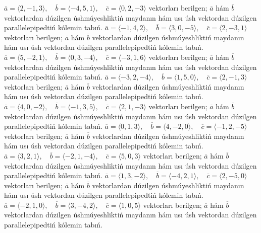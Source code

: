 \(\overline{a} = \langle 2, -1, 3 \rangle, \quad \overline{b} = \langle -4, 5, 1 \rangle, \quad \overline{c} = \langle 0, 2, -3 \rangle\) vektorları berilgen; \(\overline{a}\) hám \(\overline{b}\) vektorlardan dúzilgen úshmúyeshliktiń maydanın hám usı úsh vektordan dúzilgen parallelepipedtiń kólemin tabıń.
\(\overline{a} = \langle -1, 4, 2 \rangle, \quad \overline{b} = \langle 3, 0, -5 \rangle, \quad \overline{c} = \langle 2, -3, 1 \rangle\) vektorları berilgen; \(\overline{a}\) hám \(\overline{b}\) vektorlardan dúzilgen úshmúyeshliktiń maydanın hám usı úsh vektordan dúzilgen parallelepipedtiń kólemin tabıń.
\(\overline{a} = \langle 5, -2, 1 \rangle, \quad \overline{b} = \langle 0, 3, -4 \rangle, \quad \overline{c} = \langle -3, 1, 6 \rangle\) vektorları berilgen; \(\overline{a}\) hám \(\overline{b}\) vektorlardan dúzilgen úshmúyeshliktiń maydanın hám usı úsh vektordan dúzilgen parallelepipedtiń kólemin tabıń.
\(\overline{a} = \langle -3, 2, -4 \rangle, \quad \overline{b} = \langle 1, 5, 0 \rangle, \quad \overline{c} = \langle 2, -1, 3 \rangle\) vektorları berilgen; \(\overline{a}\) hám \(\overline{b}\) vektorlardan dúzilgen úshmúyeshliktiń maydanın hám usı úsh vektordan dúzilgen parallelepipedtiń kólemin tabıń.
\(\overline{a} = \langle 4, 0, -2 \rangle, \quad \overline{b} = \langle -1, 3, 5 \rangle, \quad \overline{c} = \langle 2, 1, -3 \rangle\) vektorları berilgen; \(\overline{a}\) hám \(\overline{b}\) vektorlardan dúzilgen úshmúyeshliktiń maydanın hám usı úsh vektordan dúzilgen parallelepipedtiń kólemin tabıń.
\(\overline{a} = \langle 0, 1, 3 \rangle, \quad \overline{b} = \langle 4, -2, 0 \rangle, \quad \overline{c} = \langle -1, 2, -5 \rangle\) vektorları berilgen; \(\overline{a}\) hám \(\overline{b}\) vektorlardan dúzilgen úshmúyeshliktiń maydanın hám usı úsh vektordan dúzilgen parallelepipedtiń kólemin tabıń.
\(\overline{a} = \langle 3, 2, 1 \rangle, \quad \overline{b} = \langle -2, 1, -4 \rangle, \quad \overline{c} = \langle 5, 0, 3 \rangle\) vektorları berilgen; \(\overline{a}\) hám \(\overline{b}\) vektorlardan dúzilgen úshmúyeshliktiń maydanın hám usı úsh vektordan dúzilgen parallelepipedtiń kólemin tabıń.
\(\overline{a} = \langle 1, 3, -2 \rangle, \quad \overline{b} = \langle -4, 2, 1 \rangle, \quad \overline{c} = \langle 2, -5, 0 \rangle\) vektorları berilgen; \(\overline{a}\) hám \(\overline{b}\) vektorlardan dúzilgen úshmúyeshliktiń maydanın hám usı úsh vektordan dúzilgen parallelepipedtiń kólemin tabıń.
\(\overline{a} = \langle -2, 1, 0 \rangle, \quad \overline{b} = \langle 3, -4, 2 \rangle, \quad \overline{c} = \langle 1, 0, 5 \rangle\) vektorları berilgen; \(\overline{a}\) hám \(\overline{b}\) vektorlardan dúzilgen úshmúyeshliktiń maydanın hám usı úsh vektordan dúzilgen parallelepipedtiń kólemin tabıń.
